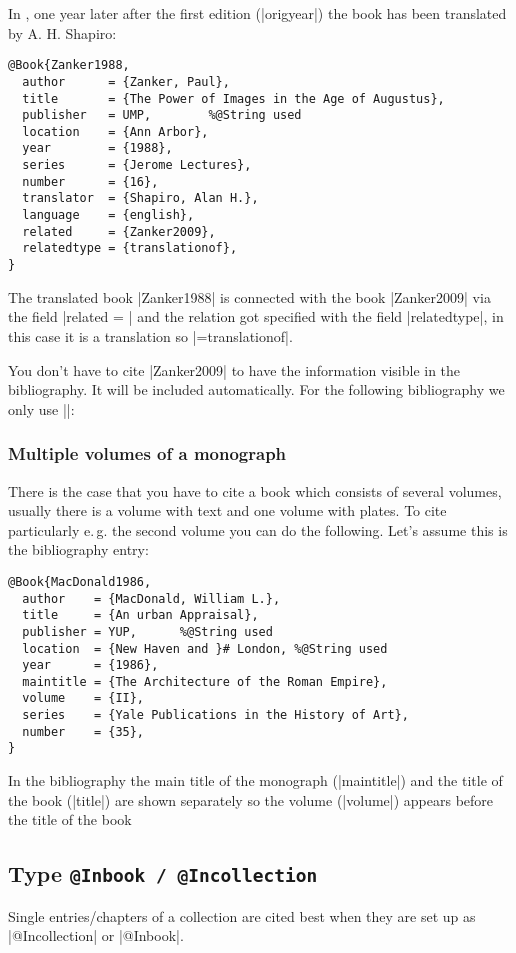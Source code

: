 \documentclass[a4paper,
10pt,
greek,
french,
spanish,
italian,
ngerman,
english
]{ltxdoc}
\begin{document}
In \citeyear{Zanker1988}, one year later after the first edition (|origyear|) the book has been translated by A. H. Shapiro:
\begin{lstlisting}[style=bibentry,label=Zanker1988,caption={{@}Book\{Zanker1988,…\} }]
@Book{Zanker1988,
  author      = {Zanker, Paul},
  title       = {The Power of Images in the Age of Augustus},
  publisher   = UMP,		%@String used
  location    = {Ann Arbor},
  year        = {1988},
  series      = {Jerome Lectures},
  number      = {16},
  translator  = {Shapiro, Alan H.},
  language    = {english},
  related     = {Zanker2009},
  relatedtype = {translationof},
}
\end{lstlisting}

The translated book |Zanker1988| is connected with the book |Zanker2009| via the field |related = | 
and the relation got specified with the field |relatedtype|, in this case it is a translation so |={translationof}|.

You don't have to cite |Zanker2009| to have the information visible in the bibliography. 
It will be included automatically. For the following bibliography we only use |\cite{Zanker1988}|:



\subsubsection{Multiple volumes of a monograph}
There is the case that you have to cite a book which consists of several volumes, 
usually there is a volume with text and one volume with plates.
To cite particularly e.\,g. the second volume you can do the following.
Let’s assume this is the bibliography entry:
\begin{lstlisting}[style=bibentry,label=MacDonald1986,caption={{@}Book\{MacDonald1986,…\} }]
@Book{MacDonald1986,
  author    = {MacDonald, William L.},
  title     = {An urban Appraisal},
  publisher = YUP,		%@String used
  location  = {New Haven and }# London, %@String used
  year      = {1986},
  maintitle = {The Architecture of the Roman Empire},
  volume    = {II},
  series    = {Yale Publications in the History of Art},
  number    = {35},
}
\end{lstlisting}
In the bibliography the main title of the monograph (|maintitle|)
and the title of the book (|title|) are shown separately  so the volume  (|volume|) 
appears before the title of the book


\subsection{Type \texttt{@Inbook / @Incollection}}\label{inbook}
Single entries/chapters of a collection are cited best when they are set up as  |@Incollection| or |@Inbook|.
\end{document}
